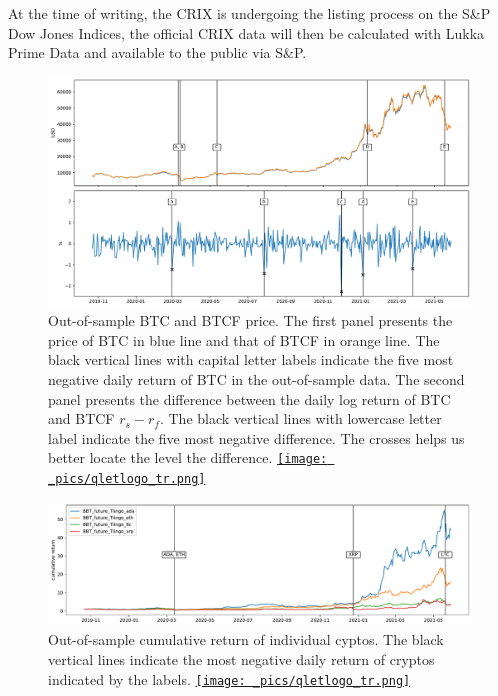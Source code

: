 At the time of writing, the CRIX is undergoing the listing process on
the S\&P Dow Jones Indices, the official CRIX data will then be
calculated with Lukka Prime Data and available to the public via S\&P.

\begin{figure}[t]
\includegraphics[width=\textwidth]{_pics/BTC_price.pdf}
  \caption{Out-of-sample BTC and BTCF price. The first panel presents the price of BTC in blue line and that of BTCF in orange line.
  The black vertical lines with capital letter labels indicate the five most negative daily return of BTC in the out-of-sample data.
  The second panel presents the difference between the daily log return of BTC and BTCF $r_s - r_f$.
  The black vertical lines with lowercase letter label indicate the five most negative difference.
  The crosses helps us better locate the level the difference.
  \href{http://www.quantlet.com/}{\texttt{[image: \_pics/qletlogo\_tr.png]}} }
\label{fig:BTC_price}
\end{figure}

\begin{figure}[t]
\includegraphics[width=\textwidth]{_pics/individualCoins_price.pdf}
  \caption{Out-of-sample cumulative return of individual cyptos.
  The black vertical lines indicate the most negative daily return of cryptos indicated by the labels.
  \href{http://www.quantlet.com/}{\texttt{[image: \_pics/qletlogo\_tr.png]}} }
\label{fig:individualCoins_price}
\end{figure}

